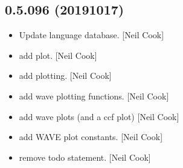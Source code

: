 \documentclass[a4paper,10pt,english]{report}
\begin{document}
\subsection{0.5.096 (2019\sphinxhyphen{}10\sphinxhyphen{}17)}
\label{\detokenize{misc/changelog:id65}}\begin{itemize}
\item {} 
Update language database. {[}Neil Cook{]}

\item {} 
 \sphinxhyphen{} add  plot. {[}Neil Cook{]}

\item {} 
 \sphinxhyphen{} add plotting. {[}Neil Cook{]}

\item {} 
 \sphinxhyphen{} add wave plotting functions. {[}Neil Cook{]}

\item {} 
 \sphinxhyphen{} add wave plots (and a
ccf plot) {[}Neil Cook{]}

\item {} 
 \sphinxhyphen{} add WAVE plot constants.
{[}Neil Cook{]}

\item {} 
 \sphinxhyphen{} remove todo statement. {[}Neil Cook{]}

\end{itemize}
\end{document}
